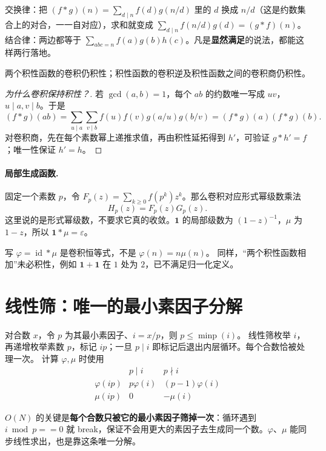 \documentclass[UTF8,a4paper,11pt,twoside,openright,fontset=fandol]{ctexbook}
\theoremstyle{definition}
\newcommand{\eps}{\varepsilon}
\newcommand{\one}{\mathbf 1}
\newcommand{\id}{\operatorname{id}}
\begin{document}
\begin{tip}[自己验证一次只要两行]
交换律：把 $(f*g)(n)=\sum_{d\mid n}f(d)g(n/d)$ 里的 $d$ 换成 $n/d$（这是约数集合上的对合，一一自对应），求和就变成 $\sum_{d\mid n}f(n/d)g(d)=(g*f)(n)$。结合律：两边都等于 $\sum_{abc=n}f(a)g(b)h(c)$。凡是\textbf{显然满足}的说法，都能这样两行落地。
\end{tip}

两个积性函数的卷积仍积性；积性函数的卷积逆及积性函数之间的卷积商仍积性。


\begin{proof}[为什么卷积保持积性？]
若 $\gcd(a,b)=1$，每个 $ab$ 的约数唯一写成 $uv$，$u\mid a,v\mid b$。于是
\[
 (f*g)(ab)=\sum_{u\mid a}\sum_{v\mid b}f(u)f(v)g(a/u)g(b/v)
 =(f*g)(a)(f*g)(b).
\]
对卷积商，先在每个素数幂上递推求值，再由积性延拓得到 $h'$，可验证 $g*h'=f$；唯一性保证 $h'=h$。
\end{proof}
\paragraph{局部生成函数.}
固定一个素数 $p$，令 $F_p(z)=\sum_{k\ge0}f(p^k)z^k$。那么卷积对应形式幂级数乘法
\[
 H_p(z)=F_p(z)G_p(z).
\]
这里说的是形式幂级数，不要求它真的收敛。$\one$ 的局部级数为 $(1-z)^{-1}$，$\mu$ 为 $1-z$，所以 $\one*\mu=\eps$。
\begin{pitfall}
写 $\varphi=\id*\mu$ 是卷积恒等式，不是 $\varphi(n)=n\mu(n)$。
同样，“两个积性函数相加”未必积性，例如 $\one+\one$ 在 $1$ 处为 $2$，已不满足归一化定义。
\end{pitfall}


\section{线性筛：唯一的最小素因子分解}
对合数 $x$，令 $p$ 为其最小素因子、$i=x/p$，则 $p\le\operatorname{minp}(i)$。
线性筛枚举 $i$，再递增枚举素数 $p$，标记 $ip$；一旦 $p\mid i$ 即标记后退出内层循环。每个合数恰被处理一次。
计算 $\varphi,\mu$ 时使用
\[
\begin{array}{c|cc}
 &p\mid i&p\nmid i\\\hline
\varphi(ip)&p\varphi(i)&(p-1)\varphi(i)\\
\mu(ip)&0&-\mu(i)
\end{array}
\]

\begin{tip}
$O(N)$ 的关键是\textbf{每个合数只被它的最小素因子筛掉一次}：循环遇到 $i\bmod p==0$ 就 break，保证不会用更大的素因子去生成同一个数。$\varphi$、$\mu$ 能同步线性求出，也是靠这条唯一分解。
\end{tip}
\end{document}
